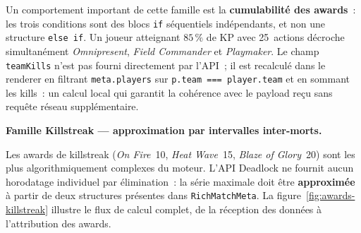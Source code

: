 \documentclass[12pt,a4paper]{article}
\begin{document}
Un comportement important de cette famille est la \textbf{cumulabilité des awards}~: les trois conditions sont des blocs \texttt{if} séquentiels indépendants, et non une structure \texttt{else if}. Un joueur atteignant $85\,\%$ de KP avec 25~actions décroche simultanément \textit{Omnipresent}, \textit{Field Commander} et \textit{Playmaker}. Le champ \texttt{teamKills} n'est pas fourni directement par l'API~; il est recalculé dans le renderer en filtrant \texttt{meta.players} sur \texttt{p.team === player.team} et en sommant les kills~: un calcul local qui garantit la cohérence avec le payload reçu sans requête réseau supplémentaire.

\medskip\textbf{Famille Killstreak --- approximation par intervalles inter-morts.}

Les awards de killstreak (\textit{On Fire}~10, \textit{Heat Wave}~15, \textit{Blaze of Glory}~20) sont les plus algorithmiquement complexes du moteur. L'API Deadlock ne fournit aucun horodatage individuel par élimination~: la série maximale doit être \textbf{approximée} à partir de deux structures présentes dans \texttt{RichMatchMeta}. La figure~\ref{fig:awards-killstreak} illustre le flux de calcul complet, de la réception des données à l'attribution des awards.
\end{document}
